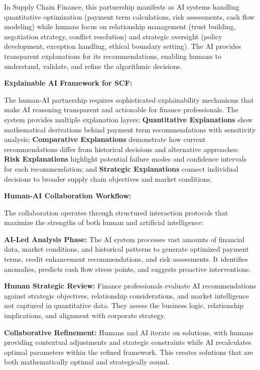 \documentclass{article}
\begin{document}
In Supply Chain Finance, this partnership manifests as AI systems handling quantitative optimization (payment term calculations, risk assessments, cash flow modeling) while humans focus on relationship management (trust building, negotiation strategy, conflict resolution) and strategic oversight (policy development, exception handling, ethical boundary setting). The AI provides transparent explanations for its recommendations, enabling humans to understand, validate, and refine the algorithmic decisions.

\textbf{Explainable AI Framework for SCF:}

The human-AI partnership requires sophisticated explainability mechanisms that make AI reasoning transparent and actionable for finance professionals. The system provides multiple explanation layers: \textbf{Quantitative Explanations} show mathematical derivations behind payment term recommendations with sensitivity analysis; \textbf{Comparative Explanations} demonstrate how current recommendations differ from historical decisions and alternative approaches; \textbf{Risk Explanations} highlight potential failure modes and confidence intervals for each recommendation; and \textbf{Strategic Explanations} connect individual decisions to broader supply chain objectives and market conditions.

\textbf{Human-AI Collaboration Workflow:}

The collaboration operates through structured interaction protocols that maximize the strengths of both human and artificial intelligence:

\textbf{AI-Led Analysis Phase:} The AI system processes vast amounts of financial data, market conditions, and historical patterns to generate optimized payment terms, credit enhancement recommendations, and risk assessments. It identifies anomalies, predicts cash flow stress points, and suggests proactive interventions.

\textbf{Human Strategic Review:} Finance professionals evaluate AI recommendations against strategic objectives, relationship considerations, and market intelligence not captured in quantitative data. They assess the business logic, relationship implications, and alignment with corporate strategy.

\textbf{Collaborative Refinement:} Humans and AI iterate on solutions, with humans providing contextual adjustments and strategic constraints while AI recalculates optimal parameters within the refined framework. This creates solutions that are both mathematically optimal and strategically sound.
\end{document}
